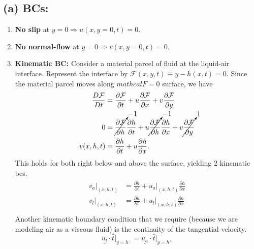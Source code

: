 \documentclass{article}
\begin{document}
\subsection*{(a) BCs:}
\begin{enumerate}
 \item \textbf{No slip} at $y = 0 \Rightarrow u(x, y=0, t) = 0$.
 \item \textbf{No normal-flow} at $y = 0 \Rightarrow v(x, y=0, t) = 0$.
 \item \textbf{Kinematic BC:} Consider a material parcel of fluid at the liquid-air interface. Represent the interface by $\mathcal{F}(x, y, t) \equiv y - h(x, t) = 0$. Since the material parcel moves along $mathcal{F} = 0$ surface, we have
 \begin{align}\label{eq:kinematic_bc}
  \begin{split}
   \frac{D\mathcal{F}}{Dt} & = \frac{\partial \mathcal{F}}{\partial t} + u\frac{\partial \mathcal{F} }{\partial x} + v\frac{\partial \mathcal{F} }{\partial y} \\
   0 &= \cancelto{-1}{\frac{\partial \mathcal{F} }{\partial h}} \frac{\partial h}{\partial t} + u \cancelto{-1}{\frac{\partial \mathcal{F} }{\partial h}} \frac{\partial h}{\partial x} + v \cancelto{1}{\frac{\partial \mathcal{F} }{\partial y}} \\
   v (x, h, t) &= \frac{\partial h}{\partial t} + u \frac{\partial h}{\partial x}.
  \end{split}
 \end{align}
 This holds for both right below and above the surface, yielding $2$ kinematic bcs.
 \begin{align}\label{eq:kinematic_bcs}
 \begin{split}
  v_{a}\bigg|_{(x, h, t)} &= \frac{\partial h}{\partial t} + u_{a}|_{(x, h, t)} \frac{\partial h}{\partial x} \\
  v_{l}\bigg|_{(x, h, t)} &= \frac{\partial h}{\partial t} + u_{l}|_{(x, h, t)} \frac{\partial h}{\partial x} \\
 \end{split}
 \end{align}
Another kinematic boundary condition that we require (because we are modeling air as a viscous fluid) is the continuity of the tangential velocity. 
\begin{equation}\label{eq:third_kinematic_bc}
 \underline{u_{l}}\cdot \hat{t}\big|_{y = h^{-}} = \underline{u_{a}}\cdot \hat{t}\big|_{y = h^{+}}
\end{equation}


\end{enumerate}
\end{document}
